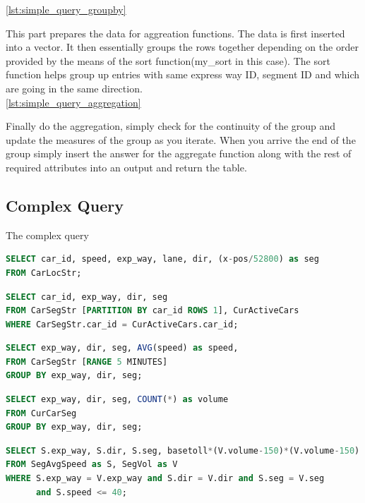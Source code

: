 \ref{lst:simple_query_groupby}
\par This part prepares the data for aggreation functions. The data is first inserted into a vector. It then essentially groups the rows together depending on the order provided by the means of the sort function(my\_sort in this case). The sort function helps group up entries with same express way ID, segment ID and which are going in the same direction.\\
\ref{lst:simple_query_aggregation}
\par Finally do the aggregation, simply check for the continuity of the group and update the measures of the group as you iterate. When you arrive the end of the group simply insert the answer for the aggregate function along with the rest of required attributes into an output and return the table.
\subsection{Complex Query}
The complex query\cite{linearroad_queries}
\begin{lstlisting}[language=SQL, caption=CarSegStr]
SELECT car_id, speed, exp_way, lane, dir, (x-pos/52800) as seg
FROM CarLocStr;
\end{lstlisting}

\begin{lstlisting}[language=SQL, caption=CurCarSeg]
SELECT car_id, exp_way, dir, seg
FROM CarSegStr [PARTITION BY car_id ROWS 1], CurActiveCars
WHERE CarSegStr.car_id = CurActiveCars.car_id;
\end{lstlisting}

\begin{lstlisting}[language=SQL, caption=SegAvgSpeed]
SELECT exp_way, dir, seg, AVG(speed) as speed,
FROM CarSegStr [RANGE 5 MINUTES]
GROUP BY exp_way, dir, seg;
\end{lstlisting}
\begin{lstlisting}[language=SQL, caption=SegVol]
SELECT exp_way, dir, seg, COUNT(*) as volume
FROM CurCarSeg
GROUP BY exp_way, dir, seg;
\end{lstlisting}
\begin{lstlisting}[language=SQL, caption=SegToll]
SELECT S.exp_way, S.dir, S.seg, basetoll*(V.volume-150)*(V.volume-150)
FROM SegAvgSpeed as S, SegVol as V
WHERE S.exp_way = V.exp_way and S.dir = V.dir and S.seg = V.seg
      and S.speed <= 40;
\end{lstlisting}

